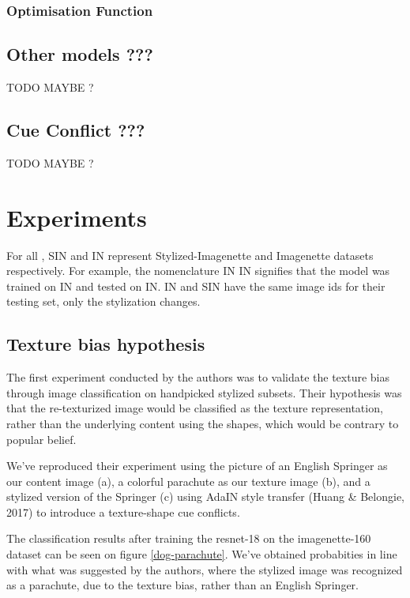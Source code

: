 \documentclass{article}
\begin{document}
\subsubsection{Optimisation Function}


\subsection{Other models ???}

TODO MAYBE ?

\subsection{Cue Conflict ???}

TODO MAYBE ?

\newpage
\section{Experiments}

For all , SIN and IN represent Stylized-Imagenette and Imagenette datasets respectively.
For example, the nomenclature IN \texorpdfstring{\textrightarrow} .IN signifies that the 
model was trained on IN and tested on IN.
IN and SIN have the same image ids for their testing set, only the stylization changes.

\subsection{Texture bias hypothesis}
The first experiment conducted by the authors was to validate the texture bias 
through image classification on handpicked stylized subsets. 
Their hypothesis was that the re-texturized image would be classified as the texture representation, rather than 
the underlying content using the shapes, which would be contrary to popular belief. \smallskip

\noindent
We've reproduced their experiment using the picture of an English Springer as our content image (a), 
a colorful parachute as our texture image (b),
and a stylized version of the Springer (c) using AdaIN style transfer 
(Huang \& Belongie, 2017) %
to introduce a texture-shape cue conflicts. \smallskip

\noindent
The classification results after training the resnet-18 on the imagenette-160 dataset 
can be seen on figure \ref{dog-parachute}.
We've obtained probabities in line with what was suggested by the authors, 
where the stylized image was recognized as a parachute, 
due to the texture bias, rather than an English Springer.
\end{document}
